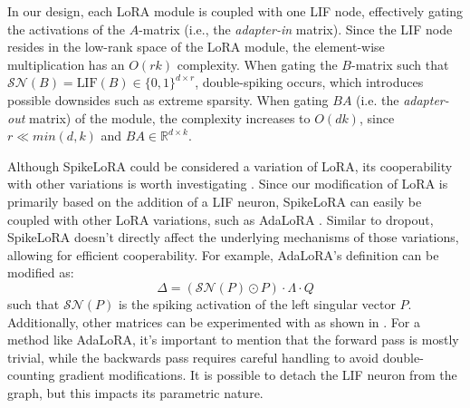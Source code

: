 \documentclass{article} %
\begin{document}
In our design, each LoRA module is coupled with one LIF node, effectively gating the activations of the \(A\)-matrix (i.e., the \emph{adapter-in} matrix). Since the LIF node resides in the low-rank space of the LoRA module, the element-wise multiplication has an \(O(rk)\) complexity. When gating the \(B\)-matrix such that \({\mathcal{SN}}(B) = \text{LIF}(B) \in \{0,1\}^{d\times r}\), double-spiking occurs, which introduces possible downsides such as extreme sparsity. When gating \(BA\) (i.e. the \emph{adapter-out} matrix) of the module, the complexity increases to \(O(dk)\), since \(r \ll min(d,k)\) and \(BA \in \mathbb{R}^{d\times k}\).

Although SpikeLoRA could be considered a variation of LoRA, its cooperability with other variations is worth investigating \citep{zhao_merging_2025}. Since our modification of LoRA is primarily based on the addition of a LIF neuron, SpikeLoRA can easily be coupled with other LoRA variations, such as AdaLoRA \citep{zhang_adalora_2023-1}. Similar to dropout, SpikeLoRA doesn't directly affect the underlying mechanisms of those variations, allowing for efficient cooperability. For example, AdaLoRA's definition can be modified as:
\begin{equation}\label{LoRAeq}
  \Delta = ({\mathcal{SN}}(P) \odot P) \cdot \Lambda \cdot Q
\end{equation}
such that \({\mathcal{SN}}(P)\) is the spiking activation of the left singular vector \(P\). Additionally, other matrices can be experimented with as shown in \cite{lin_lora_2024-1}. For a method like AdaLoRA, it's important to mention that the forward pass is mostly trivial, while the backwards pass requires careful handling to avoid double-counting gradient modifications. It is possible to detach the LIF neuron from the graph, but this impacts its parametric nature.
\end{document}
